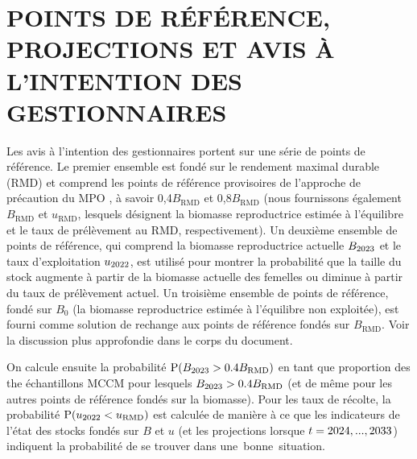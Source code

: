 \documentclass[11pt]{book}
\newcommand{\Bmsy}{B_\text{RMD}}
\newcommand{\umsy}{u_\text{RMD}}
\newcommand{\angL}{\guillemotleft\,}
\newcommand{\angR}{\,\guillemotright}
\begin{document}
\section{POINTS DE R\'{E}F\'{E}RENCE, PROJECTIONS ET AVIS \`{A} L'INTENTION DES GESTIONNAIRES}

Les avis \`{a} l'intention des gestionnaires portent sur une s\'{e}rie de points de r\'{e}f\'{e}rence.
Le premier ensemble est fond\'{e} sur le rendement maximal durable (RMD) et comprend les points de r\'{e}f\'{e}rence provisoires de l'approche de pr\'{e}caution du MPO \citep{DFO-SAR:2006_pa}, \`{a} savoir 0,4$\Bmsy$ et 0,8$\Bmsy$ (nous fournissons \'{e}galement $\Bmsy$ et $\umsy$, lesquels d\'{e}signent la biomasse reproductrice estim\'{e}e \`{a} l'\'{e}quilibre et le taux de pr\'{e}l\`{e}vement au RMD, respectivement). 
Un deuxi\`{e}me ensemble de points de r\'{e}f\'{e}rence, qui comprend la biomasse reproductrice actuelle $B_{2023}$ et le taux d'exploitation $u_{2022}$, est utilis\'{e} pour montrer la probabilit\'{e} que la taille du stock augmente \`{a} partir de la biomasse actuelle des femelles ou diminue \`{a} partir du taux de pr\'{e}l\`{e}vement actuel. Un troisi\`{e}me ensemble de points de r\'{e}f\'{e}rence, fond\'{e} sur $B_0$ (la biomasse reproductrice estim\'{e}e \`{a} l'\'{e}quilibre non exploit\'{e}e), est fourni comme solution de rechange aux points de r\'{e}f\'{e}rence fond\'{e}s sur $\Bmsy$.
Voir la discussion plus approfondie dans le corps du document.

On calcule ensuite la probabilit\'{e} $\text{P}(B_{\finalYr} > 0.4\Bmsy)$ en tant que proportion des the \Nbase{} \'{e}chantillons MCCM pour lesquels $B_{\finalYr} > 0.4\Bmsy$ (et de m\^{e}me pour les autres points de r\'{e}f\'{e}rence fond\'{e}s sur la biomasse).
Pour les taux de r\'{e}colte, la probabilit\'{e} $\text{P}(u_{\prevYear} < \umsy)$ est calcul\'{e}e de mani\`{e}re \`{a} ce que les indicateurs de l'\'{e}tat des stocks fond\'{e}s sur $B$ et $u$ (et les projections lorsque $t=2024,...,2033$) indiquent la probabilit\'{e} de se trouver dans une \angL{}bonne\angR{} situation.
\end{document}
